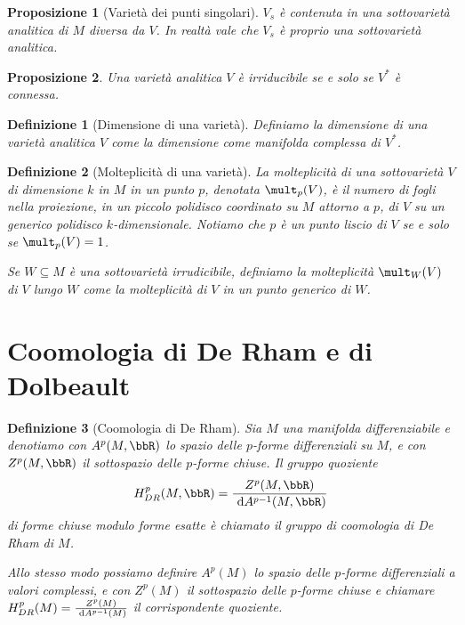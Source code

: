 \documentclass[a4paper,11pt]{article}
\newtheorem{definizione}{Definizione}
\newtheorem{proposizione}{Proposizione}
\begin{document}
\begin{proposizione}[Varietà dei punti singolari]
  $V_s$ è contenuta in una sottovarietà analitica di $M$ diversa da $V$.
  In realtà vale che $V_s$ è proprio una sottovarietà analitica.
\end{proposizione}

\begin{proposizione}
  Una varietà analitica $V$ è irriducibile se e solo se $V^*$ è connessa.
\end{proposizione}

\begin{definizione}[Dimensione di una varietà]
  Definiamo la dimensione di una varietà analitica $V$ come la dimensione come manifolda complessa di $V^*$.
\end{definizione}

\begin{definizione}[Molteplicità di una varietà]
  La molteplicità di una sottovarietà $V$ di dimensione $k$ in $M$ in un punto $p$, denotata $\mult_p (V)$, è il numero di fogli nella proiezione, in un piccolo polidisco coordinato su $M$ attorno a $p$, di $V$ su un generico polidisco $k$-dimensionale.
  Notiamo che $p$ è un punto liscio di $V$ se e solo se $\mult_p(V) = 1$.

  Se $W \subseteq M$ è una sottovarietà irrudicibile, definiamo la molteplicità $\mult_W(V)$ di $V$ lungo $W$ come la molteplicità di $V$ in un punto generico di $W$.
\end{definizione}

\section{Coomologia di De Rham e di Dolbeault}
\begin{definizione}[Coomologia di De Rham]
  Sia $M$ una manifolda differenziabile e denotiamo con $A^p(M, \bbR)$ lo spazio delle $p$-forme differenziali su $M$, e con $Z^p(M, \bbR)$ il sottospazio delle $p$-forme chiuse.
  Il gruppo quoziente
  $$ H^p_{DR} (M, \bbR) = \frac{Z^p(M, \bbR)}{\de A^{p-1}(M, \bbR)} $$
  di forme chiuse modulo forme esatte è chiamato il gruppo di coomologia di De Rham di $M$.

  Allo stesso modo possiamo definire $A^p(M)$ lo spazio delle $p$-forme differenziali a valori complessi, e con $Z^p(M)$ il sottospazio delle $p$-forme chiuse e chiamare $H^p_{DR}(M) = \frac{Z^p(M)}{\de A^{p-1}(M)}$ il corrispondente quoziente.
\end{definizione}
\end{document}
